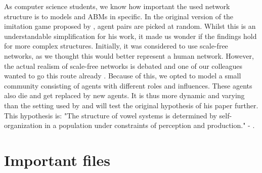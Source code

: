 As computer science students, we know how important the used network structure is to models and ABMs in specific.
In the original version of the imitation game proposed by \citet{deBoer2000}, agent pairs are picked at random.
Whilst this is an understandable simplification for his work, it made us wonder if the findings hold for more complex structures.
Initially, it was considered to use scale-free networks, as we thought this would better represent a human network.
However, the actual realism of scale-free networks is debated and one of our colleagues wanted to go this route already \citep{scalefree}.
Because of this, we opted to model a small community consisting of agents with different roles and influences.
These agents also die and get replaced by new agents.
It is thus more dynamic and varying than the setting used by \citet{deBoer2000} and will test the original hypothesis of his paper further.
This hypothesis is: "The structure of vowel systems is determined by self-organization in a population under constraints of perception and production." - \citet{deBoer2000}.

\section{Important files}
\label{sec:general_remarks_files}

